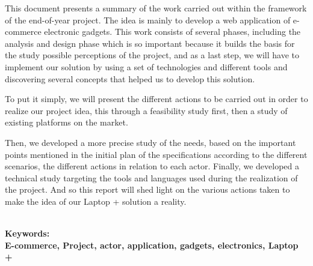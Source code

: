 \documentclass[a4paper]{report}
\begin{document}
\begin{doublespace}
This document presents a summary of the work carried out within the framework of the end-of-year project. The idea is mainly to develop a web application of e-commerce electronic gadgets. This work consists of several phases, including the analysis and design phase which is so important because it builds the basis for the study
possible perceptions of the project, and as a last step, we will have to implement our solution by
using a set of technologies and different tools and discovering several concepts that helped us to develop this solution.

To put it simply, we will present the different actions to be carried out in order to realize our project idea, this through a feasibility study first, then a study of existing platforms on the market.

Then, we developed a more precise study of the needs, based on the important points mentioned in the initial plan of the specifications according to the different scenarios, the different actions in relation to each actor.
Finally, we developed a technical study targeting the tools and languages used during the realization of the project.
And so this report will shed light on the various actions taken to make the idea of  our Laptop + solution a reality.







\textbf{\\Keywords:\\E-commerce, Project, actor, application, gadgets, electronics, Laptop +}


\end{doublespace}

\newpage

\renewcommand{\contentsname}{Table de matières}
\setcounter{tocdepth}{4}
\tableofcontents

\cleardoublepage
{}
\listoffigures
\end{document}
